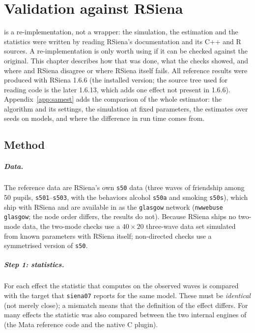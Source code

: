 \chapter{Validation against RSiena}\label{ch:validation}

\nwsaom{} is a re-implementation, not a wrapper: the simulation, the estimation and the statistics were written by reading RSiena's documentation and its C++ and R sources. A re-implementation is only worth using if it can be checked against the original. This chapter describes how that was done, what the checks showed, and where \nwsaom{} and RSiena disagree or where RSiena itself fails. All reference results were produced with RSiena 1.6.6 (the installed version; the source tree used for reading code is the later 1.6.13, which adds one effect not present in 1.6.6). Appendix~\ref{app:samest} adds the comparison of the whole estimator: the algorithm and its settings, the simulation at fixed parameters, the estimates over seeds on \benchnmodels{} models, and where the difference in run time comes from.

\section{Method}
\paragraph{Data.} The reference data are RSiena's own \texttt{s50} data (three waves of friendship among 50 pupils, \texttt{s501}--\texttt{s503}, with the behaviors alcohol \texttt{s50a} and smoking \texttt{s50s}), which ship with RSiena and are available in \nwsaom{} as the \texttt{glasgow} network (\texttt{nwwebuse glasgow}; the node order differs, the results do not). Because RSiena ships no two-mode data, the two-mode checks use a $40\times20$ three-wave data set simulated from known parameters with RSiena itself; non-directed checks use a symmetrised version of \texttt{s50}.

\paragraph{Step 1: statistics.} For each effect the statistic that \nwsaom{} computes on the observed waves is compared with the target that \texttt{siena07} reports for the same model. These must be \emph{identical} (not merely close); a mismatch means that the definition of the effect differs. For many effects the statistic was also compared between the two internal engines of \nwsaom{} (the Mata reference code and the native C plugin).

